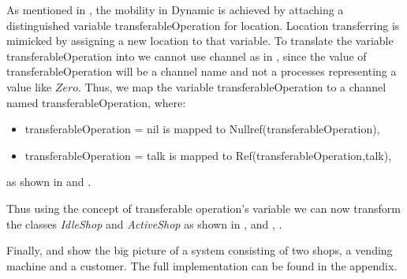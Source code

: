 As mentioned in , the mobility in Dynamic \oz{} is achieved
by attaching a distinguished variable transferableOperation for location. Location transferring
is mimicked by assigning a new location to that variable. To translate the variable transferableOperation into \picalc{} we cannot use \picalc{} channel as in , since the value of transferableOperation will be a channel name and not a processes representing a value like $Zero$. Thus, we map the variable transferableOperation to a channel named transferableOperation, where:

\begin{itemize}
\item transferableOperation = nil is mapped to Nullref(transferableOperation),

\item transferableOperation = talk is mapped to Ref(transferableOperation,talk),
\end{itemize}
as shown in  and .

Thus using the concept of transferable operation's variable we can now transform the classes \textit{IdleShop} and \textit{ActiveShop} as shown in ,  and , .



Finally,  and  show the big picture of a system consisting of two shops, a vending machine and a customer. The full implementation can be found in the appendix.
